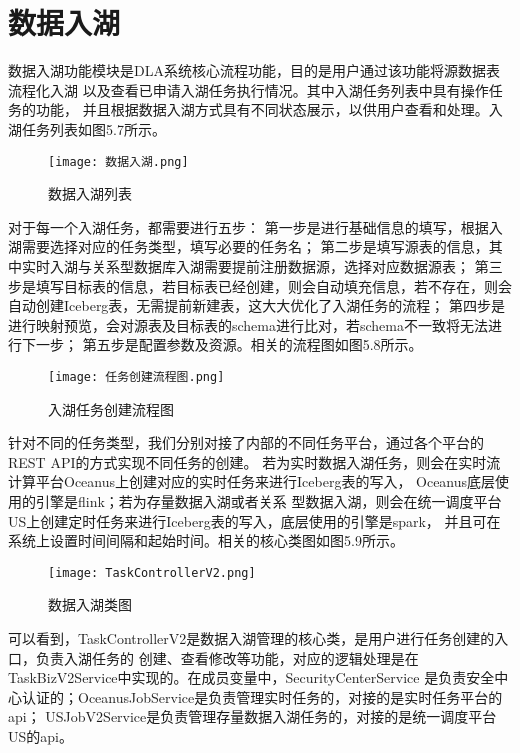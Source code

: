 \section{数据入湖}

数据入湖功能模块是DLA系统核心流程功能，目的是用户通过该功能将源数据表流程化入湖
以及查看已申请入湖任务执行情况。其中入湖任务列表中具有操作任务的功能，
并且根据数据入湖方式具有不同状态展示，以供用户查看和处理。入湖任务列表如图5.7所示。

\begin{figure}[h]
  \centering
  \texttt{[image: 数据入湖.png]}
  \caption{数据入湖列表}
  \label{fig:badge}
\end{figure}

对于每一个入湖任务，都需要进行五步：
第一步是进行基础信息的填写，根据入湖需要选择对应的任务类型，填写必要的任务名；
第二步是填写源表的信息，其中实时入湖与关系型数据库入湖需要提前注册数据源，选择对应数据源表；
第三步是填写目标表的信息，若目标表已经创建，则会自动填充信息，若不存在，则会自动创建Iceberg表，无需提前新建表，这大大优化了入湖任务的流程；
第四步是进行映射预览，会对源表及目标表的schema进行比对，若schema不一致将无法进行下一步；
第五步是配置参数及资源。相关的流程图如图5.8所示。

\begin{figure}[h]
  \centering
  \texttt{[image: 任务创建流程图.png]}
  \caption{入湖任务创建流程图}
  \label{fig:badge}
\end{figure}

针对不同的任务类型，我们分别对接了内部的不同任务平台，通过各个平台的REST API的方式实现不同任务的创建。
若为实时数据入湖任务，则会在实时流计算平台Oceanus上创建对应的实时任务来进行Iceberg表的写入，
Oceanus底层使用的引擎是flink；若为存量数据入湖或者关系
型数据入湖，则会在统一调度平台US上创建定时任务来进行Iceberg表的写入，底层使用的引擎是spark，
并且可在系统上设置时间间隔和起始时间。相关的核心类图如图5.9所示。

\begin{figure}[h]
  \centering
  \texttt{[image: TaskControllerV2.png]}
  \caption{数据入湖类图}
  \label{fig:badge}
\end{figure}

可以看到，TaskControllerV2是数据入湖管理的核心类，是用户进行任务创建的入口，负责入湖任务的
创建、查看修改等功能，对应的逻辑处理是在TaskBizV2Service中实现的。在成员变量中，SecurityCenterService
是负责安全中心认证的；OceanusJobService是负责管理实时任务的，对接的是实时任务平台的api；
USJobV2Service是负责管理存量数据入湖任务的，对接的是统一调度平台US的api。

